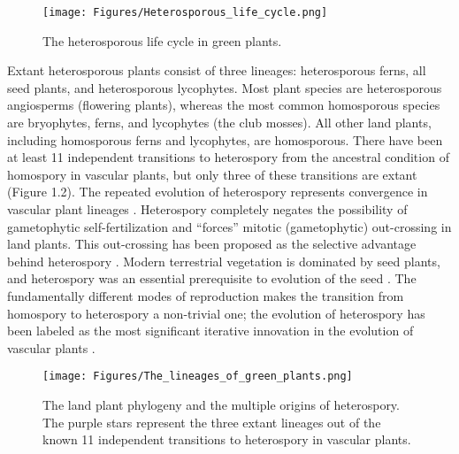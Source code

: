 \begin{figure}[ht]
    \centering
    \texttt{[image: Figures/Heterosporous\_life\_cycle.png]}
    \caption[The heterosporous life cycle in green plants.]{The heterosporous life cycle in green plants.}
    \label{fig 1.2}
\end{figure}

Extant heterosporous plants consist of three lineages: heterosporous ferns, all seed plants, and heterosporous lycophytes. Most plant species are heterosporous angiosperms (flowering plants), whereas the most common homosporous species are bryophytes, ferns, and lycophytes (the club mosses). All other land plants, including homosporous ferns and lycophytes, are homosporous. There have been at least 11 independent transitions to heterospory from the ancestral condition of homospory in vascular plants, but only three of these transitions are extant (Figure 1.2). The repeated evolution of heterospory represents convergence in vascular plant lineages \cite{Bateman1994-pu}. Heterospory completely negates the possibility of gametophytic self-fertilization and “forces” mitotic (gametophytic) out-crossing in land plants. This out-crossing has been proposed as the selective advantage behind heterospory \cite{Qiu2012-xg}. Modern terrestrial vegetation is dominated by seed plants, and heterospory was an essential prerequisite to evolution of the seed \cite{Petersen2018-wc}. The fundamentally different modes of reproduction makes the transition from homospory to heterospory a non-trivial one; the evolution of heterospory has been labeled as the most significant iterative innovation in the evolution of vascular plants \cite{Bateman1994-pu}.

\begin{figure}[ht]
    \centering
    \texttt{[image: Figures/The\_lineages\_of\_green\_plants.png]}
    \caption[The land plant phylogeny and the multiple origins of heterospory. The purple stars represent the three extant lineages out of the known 11 independent transitions to heterospory in vascular plants. 
    ]{The land plant phylogeny and the multiple origins of heterospory. The purple stars represent the three extant lineages out of the known 11 independent transitions to heterospory in vascular plants. 
    }
    \label{fig 1.3}
\end{figure}


